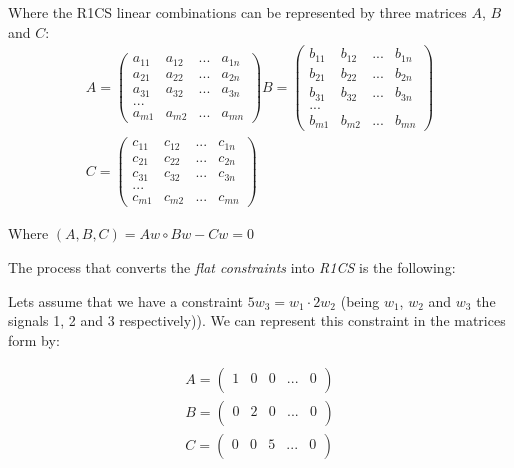 \documentclass{article}
\begin{document}
Where the R1CS linear combinations can be represented by three matrices $A$, $B$ and $C$:
$$
\begin{aligned}
A =
\begin{pmatrix}
a_{11} & a_{12} & ... & a_{1n}\\
a_{21} & a_{22} & ... & a_{2n}\\
a_{31} & a_{32} & ... & a_{3n}\\
...\\
a_{m1} & a_{m2} & ... & a_{mn}
\end{pmatrix}
B =
\begin{pmatrix}
b_{11} & b_{12} & ... & b_{1n}\\
b_{21} & b_{22} & ... & b_{2n}\\
b_{31} & b_{32} & ... & b_{3n}\\
...\\
b_{m1} & b_{m2} & ... & b_{mn}
\end{pmatrix}
\\
C =
\begin{pmatrix}
c_{11} & c_{12} & ... & c_{1n}\\
c_{21} & c_{22} & ... & c_{2n}\\
c_{31} & c_{32} & ... & c_{3n}\\
...\\
c_{m1} & c_{m2} & ... & c_{mn}
\end{pmatrix}
\end{aligned}
$$

Where
$(A, B, C) = A w \circ B w - C w = 0$

The process that converts the \emph{flat constraints} into \emph{R1CS} is the following:

Lets assume that we have a constraint $5 w_3 = w_1 \cdot 2 w_2$ (being $w_1$, $w_2$ and $w_3$ the signals 1, 2 and 3 respectively)). We can represent this constraint in the matrices form by:

$$
\begin{aligned}
A =
\begin{pmatrix}
1 & 0 & 0 & ... & 0\\
\end{pmatrix}
\\
B =
\begin{pmatrix}
0 & 2 & 0 & ... & 0\\
\end{pmatrix}
\\
C =
\begin{pmatrix}
0 & 0 & 5 & ... & 0\\
\end{pmatrix}
\end{aligned}
$$
\end{document}
